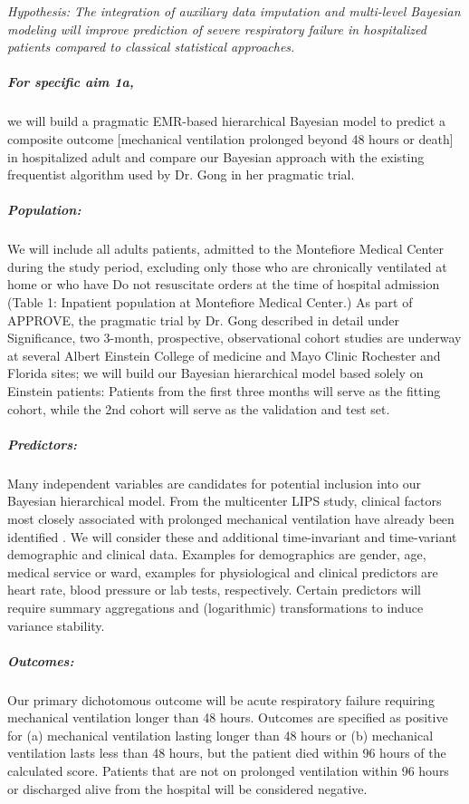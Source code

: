 \documentclass[11pt,notitlepage]{article}
\begin{document}
\textit{Hypothesis: The integration of auxiliary data imputation and multi-level Bayesian modeling will improve prediction of severe respiratory failure in hospitalized patients compared to classical statistical approaches.}


\subparagraph*{For specific aim 1a,} we will build a pragmatic EMR-based hierarchical Bayesian model to predict a composite outcome [mechanical ventilation prolonged beyond 48 hours or death] in hospitalized adult and compare our Bayesian approach with the existing frequentist algorithm used by Dr. Gong in her pragmatic trial.

\subparagraph*{Population:}
We will include all adults patients, admitted to the Montefiore Medical Center during the study period, excluding only those who are chronically ventilated at home or who have Do not resuscitate orders at the time of hospital admission (Table 1: Inpatient population at Montefiore Medical Center.) As part of APPROVE, the pragmatic trial by Dr. Gong described in detail under Significance, two 3-month, prospective, observational cohort studies are underway at several Albert Einstein College of medicine and Mayo Clinic Rochester and Florida sites; we will build our Bayesian hierarchical model based solely on Einstein patients: Patients from the first three months will serve as the fitting cohort, while the 2nd cohort will serve as the validation and test set.  

\subparagraph*{Predictors:}
Many independent variables are candidates for potential inclusion into our Bayesian hierarchical model. From the multicenter LIPS study, clinical factors most closely associated with prolonged mechanical ventilation have already been identified \cite{Herridge_12594312}. We will consider these and additional time-invariant and time-variant demographic and clinical data. Examples for demographics are gender, age, medical service or ward, examples for physiological and clinical predictors are heart rate, blood pressure or lab tests, respectively. Certain predictors will require summary aggregations and (logarithmic) transformations to induce variance stability.

\subparagraph*{Outcomes:}
Our primary dichotomous outcome will be acute respiratory failure requiring mechanical ventilation longer than 48 hours. Outcomes are specified as positive for (a) mechanical ventilation lasting longer than 48 hours or (b) mechanical ventilation lasts less than 48 hours, but the patient died within 96 hours of the calculated score. Patients that are not on prolonged ventilation within 96 hours or discharged alive from the hospital will be considered negative.
\end{document}
